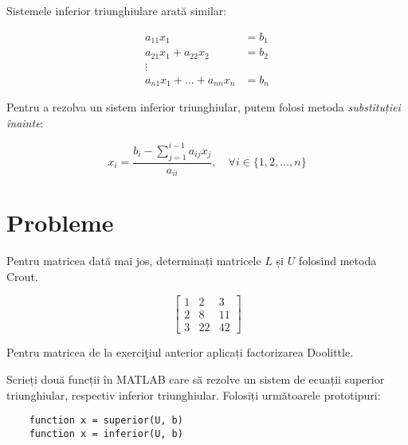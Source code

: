 \documentclass{exam}
\newcommand{\octavescript}[2]{

}
\begin{document}
\octavescript{./src/superior.m}{}

\par Sistemele inferior triunghiulare arată similar:

\begin{align*}
	a_{11} x_1                       & = b_1 \\
	a_{21} x_1 + a_{22} x_2          & = b_2 \\
	\vdots                                   \\
	a_{n1} x_1 + \ldots + a_{nn} x_n & = b_n
\end{align*}

\par Pentru a rezolva un sistem inferior triunghiular, putem folosi metoda
\textit{substituției înainte}:

\begin{equation}
	x_i = \frac{b_i - \sum_{j = 1}^{i - 1}{a_{ij} x_j}}{a_{ii}}, \quad \forall i \in \{1, 2, \ldots, n\}
\end{equation}

\octavescript{./src/inferior.m}{}

\newpage
\section{Probleme}

\begin{questions}
	\boxedpoints
	\pointsinmargin

	\question Pentru matricea dată mai jos, determinați matricele $L$ și $U$
	folosind metoda Crout.

	\begin{equation*}
		\begin{bmatrix}
			1 & 2  & 3  \\
			2 & 8  & 11 \\
			3 & 22 & 42
		\end{bmatrix}
	\end{equation*}

	\question Pentru matricea de la exerciţiul anterior aplicați factorizarea
	Doolittle.

	\question Scrieți două funcții în MATLAB care să rezolve un sistem de
	ecuații superior triunghiular, respectiv inferior triunghiular. Folosiți
	următoarele prototipuri:

	\begin{verbatim}
	function x = superior(U, b)
	function x = inferior(U, b)
	\end{verbatim}

\end{questions}
\end{document}
